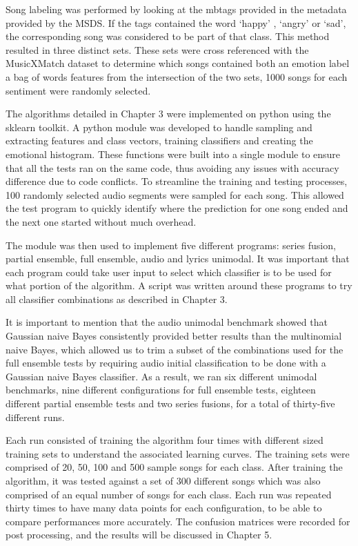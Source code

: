 Song labeling was performed by looking at the mbtags provided in the metadata provided by the MSDS. If the tags contained the word \lq happy' , \lq angry'  or \lq sad', the corresponding song was considered to be part of that class. This method resulted in three distinct sets. These sets were cross referenced with the MusicXMatch dataset to determine which songs contained both an emotion label a bag of words features from the intersection of the two sets, 1000 songs for each sentiment were randomly selected.

The algorithms detailed in Chapter 3 were implemented on python using the sklearn toolkit\protect\footnotemark \cite{scikit-learn}.   A python module was developed to handle sampling and extracting features and class vectors, training classifiers and creating the emotional histogram.  These functions were built into a single module to ensure that all the tests ran on the same code, thus avoiding any issues with accuracy difference due to code conflicts. To streamline the training and testing processes, 100 randomly selected audio segments were sampled for each song. This allowed the test program to quickly identify where the prediction for one song ended and the next one started without much overhead.


The module was then used to implement five different programs: series fusion, partial ensemble, full ensemble, audio and lyrics unimodal.  It was important that each program could take user input to select which classifier is to be used for what portion of the algorithm.  A script was written around these programs to try all classifier combinations as described in Chapter 3. 

It is important to mention that the audio unimodal benchmark showed that Gaussian naive Bayes consistently provided better results than the multinomial naive Bayes, which allowed us to trim a subset of the combinations used for the full ensemble tests by requiring audio initial classification to be done with a Gaussian naive Bayes classifier. As a result, we ran six different unimodal benchmarks, nine different configurations for full ensemble tests, eighteen different partial ensemble tests and two series fusions, for a total of thirty-five different runs. 

Each run consisted of training the algorithm four times with different sized training sets to understand the associated learning curves. The training sets were comprised of 20, 50, 100 and 500 sample songs for each class.  After training the algorithm, it was tested against a set of 300 different songs which was also comprised of an equal number of songs for each class. Each run was repeated thirty times to have many data points for each configuration, to be able to compare performances more accurately.  The confusion matrices were recorded for post processing, and the results will be discussed in Chapter 5. 


